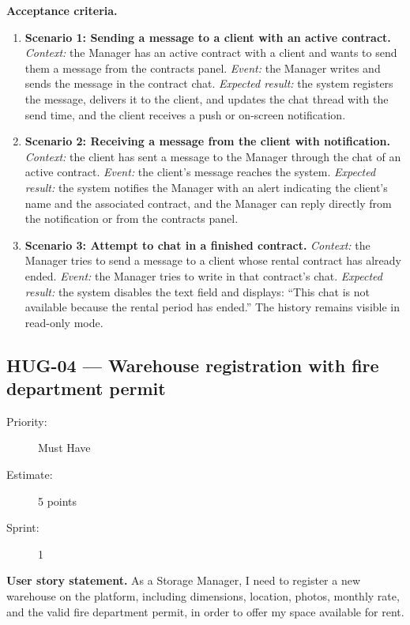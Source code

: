 \documentclass[11pt,a4paper,oneside]{report}
\begin{document}
\textbf{Acceptance criteria.}
\begin{enumerate}
\item \textbf{Scenario 1: Sending a message to a client with an active contract.} \emph{Context:} the Manager has an active contract with a client and wants to send them a message from the contracts panel. \emph{Event:} the Manager writes and sends the message in the contract chat. \emph{Expected result:} the system registers the message, delivers it to the client, and updates the chat thread with the send time, and the client receives a push or on-screen notification.
\item \textbf{Scenario 2: Receiving a message from the client with notification.} \emph{Context:} the client has sent a message to the Manager through the chat of an active contract. \emph{Event:} the client's message reaches the system. \emph{Expected result:} the system notifies the Manager with an alert indicating the client's name and the associated contract, and the Manager can reply directly from the notification or from the contracts panel.
\item \textbf{Scenario 3: Attempt to chat in a finished contract.} \emph{Context:} the Manager tries to send a message to a client whose rental contract has already ended. \emph{Event:} the Manager tries to write in that contract's chat. \emph{Expected result:} the system disables the text field and displays: ``This chat is not available because the rental period has ended.'' The history remains visible in read-only mode.
\end{enumerate}

\subsection{HUG-04 --- Warehouse registration with fire department permit}
\label{req:HUG-04}
\begin{description}
\item[Priority:] Must Have \quad \item[Estimate:] 5 points \quad \item[Sprint:] 1
\end{description}

\textbf{User story statement.} As a Storage Manager, I need to register a new warehouse on the platform, including dimensions, location, photos, monthly rate, and the valid fire department permit, in order to offer my space available for rent.
\end{document}
